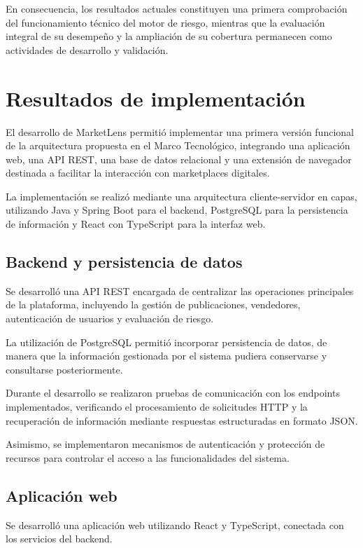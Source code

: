 En consecuencia, los resultados actuales constituyen una primera
comprobación del funcionamiento técnico del motor de riesgo, mientras
que la evaluación integral de su desempeño y la ampliación de su
cobertura permanecen como actividades de desarrollo y validación.

\section{Resultados de implementación}

El desarrollo de MarketLens permitió implementar una primera versión
funcional de la arquitectura propuesta en el Marco Tecnológico,
integrando una aplicación web, una API REST, una base de datos
relacional y una extensión de navegador destinada a facilitar la
interacción con marketplaces digitales.

La implementación se realizó mediante una arquitectura cliente-servidor
en capas, utilizando Java y Spring Boot para el backend, PostgreSQL para
la persistencia de información y React con TypeScript para la interfaz
web.

\subsection{Backend y persistencia de datos}

Se desarrolló una API REST encargada de centralizar las operaciones
principales de la plataforma, incluyendo la gestión de publicaciones,
vendedores, autenticación de usuarios y evaluación de riesgo.

La utilización de PostgreSQL permitió incorporar persistencia de datos,
de manera que la información gestionada por el sistema pudiera
conservarse y consultarse posteriormente.

Durante el desarrollo se realizaron pruebas de comunicación con los
endpoints implementados, verificando el procesamiento de solicitudes
HTTP y la recuperación de información mediante respuestas estructuradas
en formato JSON.

Asimismo, se implementaron mecanismos de autenticación y protección de
recursos para controlar el acceso a las funcionalidades del sistema.

\subsection{Aplicación web}

Se desarrolló una aplicación web utilizando React y TypeScript,
conectada con los servicios del backend.

